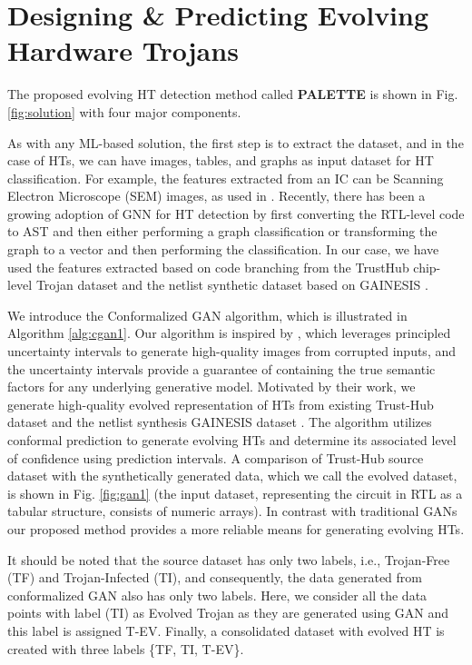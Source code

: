 \section*{Designing \& Predicting Evolving Hardware Trojans}
\label{sec:Solution}
The proposed evolving HT detection method called \textbf{PALETTE} is shown in Fig. \ref{fig:solution} with four major components.

 As with any ML-based solution, the first step is to extract the dataset, and in the case of HTs, we can have images, tables, and graphs as input dataset for HT classification. For example, the features extracted from an IC can be Scanning Electron Microscope (SEM) images, as used in \cite{vashistha2018trojan,shi2019golden}. Recently, there has been a growing adoption of GNN for HT detection \cite{alrahis2022embracing} by first converting the RTL-level code to AST and then either performing a graph classification or transforming the graph to a vector and then performing the classification. 
In our case, we have used the features extracted based on code branching from the TrustHub chip-level Trojan dataset \cite{px6s-sm21-22} and the netlist synthetic dataset based on GAINESIS \cite{liakos2022gainesis}. 

 We introduce the Conformalized GAN algorithm, which is illustrated in Algorithm \ref{alg:cgan1}. Our algorithm is inspired by \cite{sankaranarayanan2022semantic}, which leverages principled uncertainty intervals to generate high-quality images from corrupted inputs, and the uncertainty intervals provide a guarantee of containing the true semantic factors for any underlying generative model. Motivated by their work, we generate high-quality evolved representation of HTs from existing Trust-Hub dataset \cite{px6s-sm21-22} and the netlist synthesis GAINESIS dataset \cite{liakos2022gainesis}. 
The algorithm utilizes conformal prediction to generate evolving HTs and determine its associated level of confidence using prediction intervals. A comparison of Trust-Hub source dataset with the synthetically generated data, which we call the evolved dataset, is shown in Fig. \ref{fig:gan1} (the input dataset, representing the circuit in RTL as a tabular structure, consists of numeric arrays). In contrast with traditional GANs our proposed method provides a more reliable means for generating evolving HTs.  




It should be noted that the source dataset has only two labels, i.e., Trojan-Free (TF) and Trojan-Infected (TI), and consequently, the data generated from conformalized GAN also has only two labels. Here, we consider all the data points with label (TI) as Evolved Trojan as they are generated using GAN and this label is assigned T-EV. Finally, a consolidated dataset with evolved HT is created with three labels \{TF, TI, T-EV\}.




